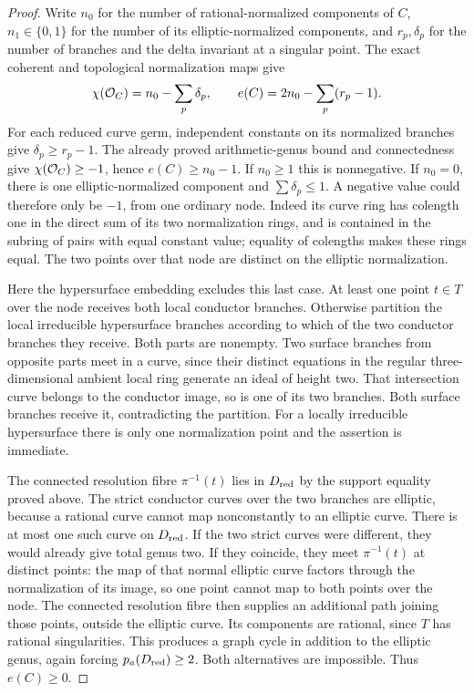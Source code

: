 \begin{proof}
Write $n_0$ for the number of rational-normalized components
of $C$, $n_1\in\{0,1\}$ for the number of its
elliptic-normalized components, and $r_p,\delta_p$ for the
number of branches and the delta invariant at a singular
point. The exact coherent and topological normalization maps
give
\[
 \chi(\mathcal O_C)=n_0-\sum_p\delta_p,
 \qquad e(C)=2n_0-\sum_p(r_p-1).
\]
For each reduced curve germ, independent constants on its
normalized branches give $\delta_p\ge r_p-1$.
The already proved arithmetic-genus bound and connectedness
give $\chi(\mathcal O_C)\ge-1$, hence $e(C)\ge n_0-1$.
If $n_0\ge1$ this is nonnegative. If $n_0=0$, there is
one elliptic-normalized component and
$\sum\delta_p\le1$. A negative value could therefore only
be $-1$, from one ordinary node. Indeed its curve ring has
colength one in the direct sum of its two normalization
rings, and is contained in the subring of pairs with equal
constant value; equality of colengths makes these rings
equal. The two points over that node are distinct on the
elliptic normalization.

Here the hypersurface embedding excludes this last case.
At least one point $t\in T$ over the node receives both
local conductor branches. Otherwise partition the local
irreducible hypersurface branches according to which of
the two conductor branches they receive. Both parts are
nonempty. Two surface branches from opposite parts meet
in a curve, since their distinct equations in the regular
three-dimensional ambient local ring generate an ideal
of height two. That intersection curve belongs to the
conductor image, so is one of its two branches. Both
surface branches receive it, contradicting the partition.
For a locally irreducible hypersurface there is only one
normalization point and the assertion is immediate.

The connected resolution fibre $\pi^{-1}(t)$ lies in
$D_{\rm red}$ by the support equality proved above.
The strict conductor curves over the two branches are
elliptic, because a rational curve cannot map
nonconstantly to an elliptic curve. There is at most one
such curve on $D_{\rm red}$. If the two strict curves
were different, they would already give total genus two.
If they coincide, they meet $\pi^{-1}(t)$ at distinct
points: the map of that normal elliptic curve factors
through the normalization of its image, so one point
cannot map to both points over the node. The connected
resolution fibre then supplies an additional path joining
those points, outside the elliptic curve. Its components
are rational, since $T$ has rational singularities.
This produces a graph cycle in addition to the elliptic
genus, again forcing $p_a(D_{\rm red})\ge2$.
Both alternatives are impossible. Thus $e(C)\ge0$.
\end{proof}

